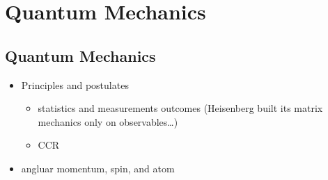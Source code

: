 \documentclass[letterpaper,10pt,english]{jupyterBook}
\begin{document}
\sphinxstepscope


\part{Quantum Mechanics}

\sphinxstepscope


\chapter{Quantum Mechanics}
\label{\detokenize{ch/quantum-mechanics/intro:quantum-mechanics}}\label{\detokenize{ch/quantum-mechanics/intro:quantum-mechanics-intro}}\label{\detokenize{ch/quantum-mechanics/intro::doc}}\begin{itemize}
\item {} 
\sphinxAtStartPar
Principles and postulates
\begin{itemize}
\item {} 
\sphinxAtStartPar
statistics and measurements outcomes (Heisenberg built its matrix mechanics only on observables…)

\item {} 
\sphinxAtStartPar
CCR

\end{itemize}

\item {} 
\sphinxAtStartPar
angluar momentum, spin, and atom

\end{itemize}
\end{document}
